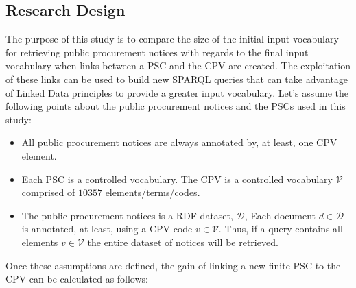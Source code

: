 \subsection{Research Design}
The purpose of this study is to compare the size of the initial input vocabulary for retrieving public procurement notices 
with regards to the final input vocabulary when links between a PSC and the CPV are created. The exploitation of these links can be used 
to build new SPARQL queries that can take advantage of Linked Data principles to provide a greater input vocabulary. Let's assume the following points about the 
public procurement notices and the PSCs used in this study:
\begin{itemize}
 \item All public procurement notices are always annotated by, at least, one CPV element.
 \item Each PSC is a controlled vocabulary. The CPV is a controlled vocabulary $\mathcal{V}$ comprised of $10357$ elements/terms/codes.
 \item The public procurement notices is a RDF dataset, $\mathcal{D}$,
 Each document $d \in \mathcal{D}$ is annotated, at least, using a CPV code $v \in \mathcal{V}$. Thus, 
 if a query contains all elements $v \in \mathcal{V}$ the entire dataset of notices will be retrieved.
\end{itemize}
Once these assumptions are defined, the gain of linking a new finite PSC to the CPV can be calculated as follows:
